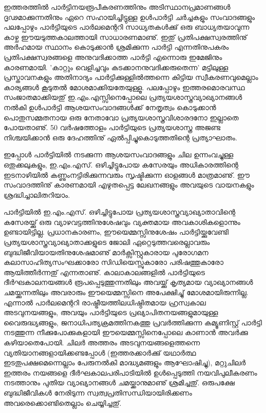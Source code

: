 ഇത്തരത്തില്‍ പാര്‍ട്ടിനയരൂപീകരണത്തിനും അടിസ്ഥാനപ്രമാണങ്ങള്‍ ദൃഢമാക്കുന്നതിനും ഏറെ സഹായിച്ചിട്ടുള്ള 
ഉള്‍പാര്‍ട്ടി ചര്‍ച്ചകളും സംവാദങ്ങളും പലപ്പോഴും പാര്‍ട്ടിയുടെ പാര്‍ലമെന്ററി സാധ്യതകള്‍ക്കു് ഒരു ബാധ്യതയാവുന്ന 
കാഴ്ച ഈയടുത്തകാലത്തായി സാധാരണമാണു്. ഇതു് പ്രതിപക്ഷസ്വരത്തിനു് അര്‍ഹമായ സ്ഥാനം കൊടുക്കാന്‍ 
ശ്രമിക്കുന്ന പാര്‍ട്ടി എന്നതിനുപകരം പ്രതിപക്ഷസ്വരങ്ങളെ അനുവദിക്കാത്ത പാര്‍ട്ടി എന്നൊരു ഇമേജിനും കാരണമായി. 
'കാറ്റും വെളിച്ചവും കടക്കാനനുവദിക്കരുതെന്ന' മട്ടിലുള്ള പ്രസ്താവനകളും അതിനാദ്യം പാര്‍ട്ടിക്കുള്ളില്‍ത്തന്നെ കിട്ടിയ 
സ്വീകരണവുമെല്ലാം കാര്യങ്ങള്‍ കൂടുതല്‍ മോശമാക്കിയതേയുള്ളൂ. പലപ്പോഴും ഇത്തരമൊരവസ്ഥ സംജാതമാക്കിയതു്
ഇ.എം.എസ്സിനെപ്പോലെ പ്രത്യയശാസ്ത്രവ്യാഖ്യാനങ്ങള്‍ നല്‍കി ഉള്‍പാര്‍ട്ടി ആശയസംവാദങ്ങള്‍ക്ക് നേതൃത്വം കൊടുക്കാന്‍
പൊതുസമ്മതനായ ഒരു നേതാവോ പ്രത്യയശാസ്ത്രവിശാരദനോ ഇല്ലാതെ പോയതാണു്. 50 വര്‍ഷത്തോളം പാര്‍ട്ടിയുടെ 
പ്രത്യയശാസ്ത്ര അജണ്ട നിശ്ചയിക്കാന്‍ ഒരു ദേഹത്തിനു് ഏല്‍പ്പിച്ചുകൊടുത്തതിന്റെ പ്രത്യാഘാതം.

ഇപ്പോള്‍ പാര്‍ട്ടിയില്‍ നടക്കുന്ന ആശയസംവാദങ്ങളും ചില ഉന്നംവച്ചുള്ള ഒതുക്കലുകളും, ഇ.എം.എസ്. ഒഴിച്ചിട്ടുപോയ 
കസേരയും അധികാരത്തിന്റെ ഇടനാഴിയില്‍ കണ്ണുംനട്ടിരിക്കുന്നവരും സൃഷ്ടിക്കുന്ന ഓളങ്ങള്‍ മാത്രമാണു്. ഈ 
സംവാദത്തിനു് കാരണമായി എഴുതപ്പെട്ട ലേഖനങ്ങളും അവയുടെ വായനകളും ശ്രദ്ധിച്ചാലിതറിയാം.

പാര്‍ട്ടിയില്‍ ഇ.എം.എസ്. ഒഴിച്ചിട്ടുപോയ പ്രത്യയശാസ്ത്രവ്യാഖ്യാതാവിന്റെ കസേരയ്ക്കു് ഒരു വ്യാഴവട്ടത്തിനുശേഷവും 
വ്യക്തമായ അവകാശികളൊന്നും ഉണ്ടായിട്ടില്ല. പ്രധാനകാരണം, ഈയെമ്മസ്സിനുശേഷം പാര്‍ട്ടിയ്ക്കുവേണ്ടി 
പ്രത്യയശാസ്ത്രവ്യാഖ്യാതാക്കളുടെ ജോലി ഏറ്റെടുത്തവരെല്ലാവരും ബുദ്ധിജീവിയായതിനുശേഷമാണു് മാര്‍ക്സിസ്റ്റുകാരായ 
പുരോഗമന കലാസാഹിത്യസംഘക്കാരോ സിഡിയെസ്സുകാരോ പരിഷത്തുകാരോ ആയിത്തീര്‍ന്നതു് എന്നതാണു്. 
കാലാകാലങ്ങളില്‍ പാര്‍ട്ടിയുടെ ദീര്‍ഘകാലനയങ്ങള്‍ രൂപപ്പെടുത്തുന്നതിലും അവയ്ക്കു് കൃത്യമായ വ്യാഖ്യാനങ്ങള്‍ 
ചമയ്ക്കുന്നതിലും അവരാരും ഈയെമ്മസ്സിനെ അപേക്ഷിച്ചു് മോശമായിരുന്നില്ല. എന്നാല്‍ പാര്‍ലമെന്ററി 
രാഷ്ട്രീയത്തിലധിഷ്ഠിതമായ ഹ്രസ്വകാല അടവുനയങ്ങളും, അവയും പാര്‍ട്ടിയുടെ പ്രഖ്യാപിതനയങ്ങളുമായുള്ള 
വൈരുദ്ധ്യങ്ങളും, ജനാധിപത്യക്രമത്തിനകത്തു പ്രവര്‍ത്തിക്കുന്ന കമ്യൂണിസ്റ്റ് പാര്‍ട്ടി നടത്തുന്ന 
നീക്കുപോക്കുകളായി ഈയെമ്മസ്സിനെപ്പോലെ കാണാന്‍ അവര്‍ക്കു കഴിയാതെപോയി. ചിലര്‍ അത്തരം അടവുനയങ്ങളെത്തന്നെ 
വ്യതിയാനങ്ങളായിക്കണ്ടപ്പോള്‍ (ഇത്തരക്കാര്‍ക്കു് യഥാര്‍ത്ഥ ഇടതുപക്ഷമെന്നെല്ലാം പേരുനല്‍കി മാദ്ധ്യമങ്ങളും 
ആഘോഷിച്ചു), മറ്റുചിലര്‍ ഇത്തരം നയങ്ങളെ ദീര്‍ഘകാലപരിപാടിയില്‍ ഉള്‍പ്പെടുത്തി നയവിപുലീകരണം നടത്താനും 
പുതിയ വ്യാഖ്യാനങ്ങള്‍ ചമയ്ക്കാനുമാണു് ശ്രമിച്ചതു്. ഒരുപക്ഷേ ബുദ്ധിജീവികള്‍ നേരിടുന്ന സ്വത്വപ്രതിസന്ധിയായിരിക്കണം 
അവരെക്കൊണ്ടിതെല്ലാം ചെയ്യിച്ചതു്.

